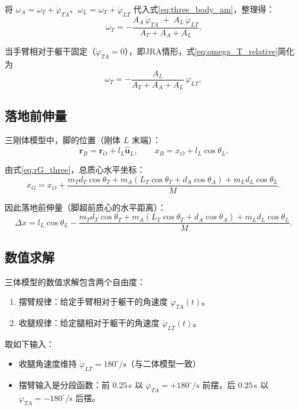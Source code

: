 \documentclass{article}
\begin{document}
将 $\omega_A = \omega_T + \dot\varphi_{TA}$、$\omega_L = \omega_T + \dot\varphi_{LT}$ 代入式\eqref{eq:three_body_am}，整理得：
\begin{equation}
\boxed{\omega_T = -\frac{A_A\,\dot\varphi_{TA} \;+\; A_L\,\dot\varphi_{LT}}{A_T + A_A + A_L}}. \label{eq:omega_T_relative}
\end{equation}

当手臂相对于躯干固定（$\dot\varphi_{TA} = 0$），即JRA情形，式\eqref{eq:omega_T_relative}简化为
\[
\omega_T = -\frac{A_L}{A_T + A_A + A_L}\,\dot\varphi_{LT},
\]

\subsection{落地前伸量}

三刚体模型中，脚的位置（刚体 $L$ 末端）：
\begin{equation}
\mathbf{r}_B = \mathbf{r}_O + l_L \hat{\mathbf{u}}_L,
\qquad x_B = x_O + l_L \cos\theta_L.
\end{equation}

由式\eqref{eq:rG_three}，总质心水平坐标：
\begin{equation}
x_G = x_O + \frac{m_T d_T \cos\theta_T + m_A (L_T \cos\theta_T + d_A \cos\theta_A) + m_L d_L \cos\theta_L}{M}.
\end{equation}

因此落地前伸量（脚超前质心的水平距离）：
\begin{equation}
\boxed{\Delta x = l_L\cos\theta_L - \frac{m_T d_T \cos\theta_T + m_A (L_T \cos\theta_T + d_A \cos\theta_A) + m_L d_L \cos\theta_L}{M}}. \label{eq:Dx_three_body}
\end{equation}

\subsection{数值求解}

三体模型的数值求解包含两个自由度：
\begin{enumerate}
\item 摆臂规律：给定手臂相对于躯干的角速度 $\dot\varphi_{TA}(t)$。
\item 收腿规律：给定腿相对于躯干的角速度 $\dot\varphi_{LT}(t)$。
\end{enumerate}
\medskip

取如下输入：
\begin{itemize}
    \item 收腿角速度维持 $\dot\varphi_{LT}=180^\circ/\text{s}$（与二体模型一致）
    \item 摆臂输入是分段函数：前 $0.25$\,s 以 $\dot\varphi_{TA}=+180^\circ/\text{s}$ 前摆，后 $0.25$\,s 以 $\dot\varphi_{TA}=-180^\circ/\text{s}$ 后摆。
\end{itemize}
\end{document}

